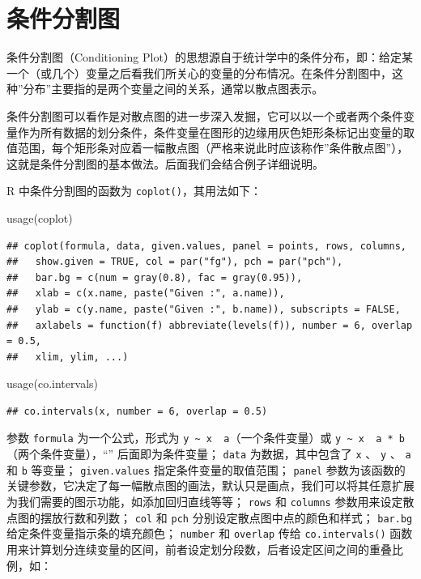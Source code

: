 \documentclass[
  b5paper,
  UTF8,twoside]{book}
\newenvironment{Shaded}{\begin{snugshade}}{\end{snugshade}}
\newcommand{\FunctionTok}[1]{\textcolor[rgb]{0.00,0.00,0.00}{#1}}
\newcommand{\NormalTok}[1]{#1}
\begin{document}
\hypertarget{sec:coplot}{%
\section{条件分割图}\label{sec:coplot}}

条件分割图（Conditioning Plot）的思想源自于统计学中的条件分布，即：给定某一个（或几个）变量之后看我们所关心的变量的分布情况。在条件分割图中，这种''分布''主要指的是两个变量之间的关系，通常以散点图表示。

条件分割图可以看作是对散点图的进一步深入发掘，它可以以一个或者两个条件变量作为所有数据的划分条件，条件变量在图形的边缘用灰色矩形条标记出变量的取值范围，每个矩形条对应着一幅散点图（严格来说此时应该称作''条件散点图''），这就是条件分割图的基本做法。后面我们会结合例子详细说明。

R 中条件分割图的函数为 \texttt{coplot()}，其用法如下：

\begin{Shaded}
\begin{Highlighting}[]
\FunctionTok{usage}\NormalTok{(coplot)}
\end{Highlighting}
\end{Shaded}

\begin{verbatim}
## coplot(formula, data, given.values, panel = points, rows, columns,
##   show.given = TRUE, col = par("fg"), pch = par("pch"),
##   bar.bg = c(num = gray(0.8), fac = gray(0.95)),
##   xlab = c(x.name, paste("Given :", a.name)),
##   ylab = c(y.name, paste("Given :", b.name)), subscripts = FALSE,
##   axlabels = function(f) abbreviate(levels(f)), number = 6, overlap = 0.5,
##   xlim, ylim, ...)
\end{verbatim}

\begin{Shaded}
\begin{Highlighting}[]
\FunctionTok{usage}\NormalTok{(co.intervals)}
\end{Highlighting}
\end{Shaded}

\begin{verbatim}
## co.intervals(x, number = 6, overlap = 0.5)
\end{verbatim}

参数 \texttt{formula} 为一个公式，形式为 \texttt{y\ \textasciitilde{}\ x\ \textbar{}\ a}（一个条件变量）或 \texttt{y\ \textasciitilde{}\ x\ \textbar{}\ a\ *\ b}（两个条件变量），``\texttt{\textbar{}}'' 后面即为条件变量； \texttt{data} 为数据，其中包含了 \texttt{x} 、 \texttt{y} 、 \texttt{a} 和 \texttt{b} 等变量； \texttt{given.values} 指定条件变量的取值范围； \texttt{panel} 参数为该函数的关键参数，它决定了每一幅散点图的画法，默认只是画点，我们可以将其任意扩展为我们需要的图示功能，如添加回归直线等等； \texttt{rows} 和 \texttt{columns} 参数用来设定散点图的摆放行数和列数； \texttt{col} 和 \texttt{pch} 分别设定散点图中点的颜色和样式； \texttt{bar.bg} 给定条件变量指示条的填充颜色； \texttt{number} 和 \texttt{overlap} 传给 \texttt{co.intervals()} 函数用来计算划分连续变量的区间，前者设定划分段数，后者设定区间之间的重叠比例，如：
\end{document}
